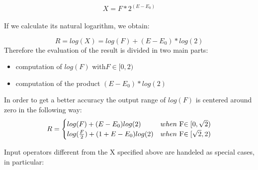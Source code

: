\documentclass{report}
\begin{document}
$$X=F*2^{(E-E_0)}$$
\\If we calculate its natural logarithm, we obtain:

$$R = log(X) = log(F)+(E-E_0)*log(2)$$
Therefore the evaluation of the result is divided in two main parts:
\begin{itemize}
\item computation of $log(F)$ with$ F \in [0,2)$
\item computation of the product $(E-E_0)*log(2)$
\end{itemize}
In order to get a better accuracy the output range of $log(F)$ is centered around zero in the following way:
\[
R=
\begin{cases}
        log(F)+(E-E_0)log(2)  & when  $ F$ \in[0,\sqrt{2})\\
        log(\frac{F}{2})+(1+E-E_0)log(2) & when  $ F$ \in[\sqrt{2},2)
\end{cases}
\]

Input operators different from the X specified above are handeled as special cases, in particular:
\end{document}
